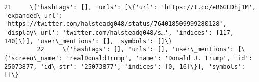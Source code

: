 \documentclass[11pt]{article}
\begin{document}
\begin{Verbatim}[commandchars=\\\{\}]
         21     \{'hashtags': [], 'urls': [\{'url': 'https://t.co/eR6GLDhj1M', 'expanded\_url': 'https://twitter.com/halsteadg048/status/764018509999280128', 'display\_url': 'twitter.com/halsteadg048/s…', 'indices': [117, 140]\}], 'user\_mentions': [], 'symbols': []\}                                                                                                                                                                                                                                                                                                                                                                                                                                                                                                                                                                                                                                                                                                                                                                                                                                                                                                                                                          
         22     \{'hashtags': [], 'urls': [], 'user\_mentions': [\{'screen\_name': 'realDonaldTrump', 'name': 'Donald J. Trump', 'id': 25073877, 'id\_str': '25073877', 'indices': [0, 16]\}], 'symbols': []\}                                                                                                                                                                                                                                                                                                                                                                                                                                                                                                                                                                                                                                                                                                                                                                                                                                                                                                                                                                                                                        

\end{Verbatim}
\end{document}
